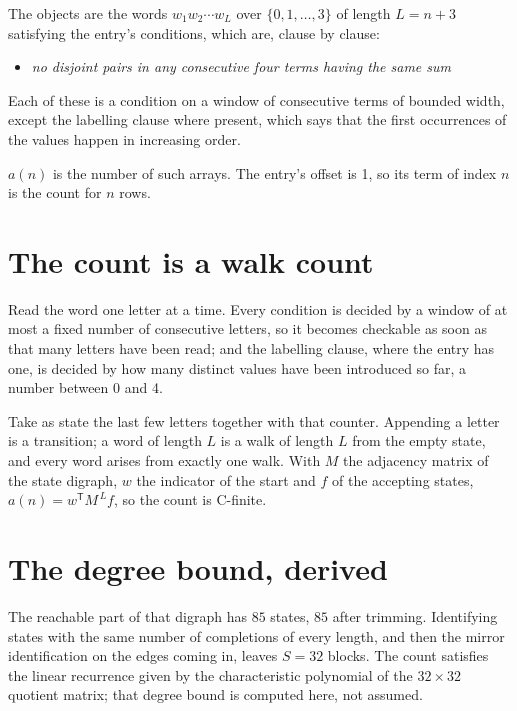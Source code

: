 \documentclass[11pt]{article}
\theoremstyle{definition}
\begin{document}
The objects are the words $w_1 w_2 \cdots w_L$ over $\{0,1,\dots,3\}$ of length $L = n + 3$ satisfying the entry's conditions, which are, clause by clause:

\begin{itemize}

\item {\itshape no disjoint pairs in any consecutive four terms having the same sum}

\end{itemize}

Each of these is a condition on a window of consecutive terms of bounded width, except the labelling clause where present, which says that the first occurrences of the values happen in increasing order.

$a(n)$ is the number of such arrays. The entry's offset is 1, so its term of index $n$ is the count for $n$ rows.

\section{The count is a walk count}

Read the word one letter at a time. Every condition is decided by a window of at most a fixed number of consecutive letters, so it becomes checkable as soon as that many letters have been read; and the labelling clause, where the entry has one, is decided by how many distinct values have been introduced so far, a number between $0$ and 4.

Take as state the last few letters together with that counter. Appending a letter is a transition; a word of length $L$ is a walk of length $L$ from the empty state, and every word arises from exactly one walk. With $M$ the adjacency matrix of the state digraph, $w$ the indicator of the start and $f$ of the accepting states, $a(n) = w^{\mathsf T}M^{\,L}f$, so the count is C-finite.

\section{The degree bound, derived}

The reachable part of that digraph has $85$ states, $85$ after trimming. Identifying states with the same number of completions of every length, and then the mirror identification on the edges coming in, leaves $S = 32$ blocks. The count satisfies the linear recurrence given by the characteristic polynomial of the $32\times32$ quotient matrix; that degree bound is computed here, not assumed.
\end{document}
